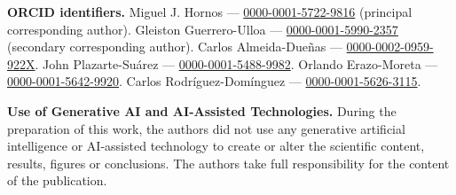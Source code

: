 \documentclass[pdflatex,sn-apa]{sn-jnl}%
\begin{document}
        \noindent \textbf{ORCID identifiers.}
            Miguel J. Hornos --- \href{https://orcid.org/0000-0001-5722-9816}{0000-0001-5722-9816} (principal corresponding author).
            Gleiston Guerrero-Ulloa --- \href{https://orcid.org/0000-0001-5990-2357}{0000-0001-5990-2357} (secondary corresponding author).
            Carlos Almeida-Due\~nas --- \href{https://orcid.org/0000-0002-0959-922X}{0000-0002-0959-922X}.
            John Plazarte-Su\'arez --- \href{https://orcid.org/0000-0001-5488-9982}{0000-0001-5488-9982}.
            Orlando Erazo-Moreta --- \href{https://orcid.org/0000-0001-5642-9920}{0000-0001-5642-9920}.
            Carlos Rodr\'iguez-Dom\'inguez --- \href{https://orcid.org/0000-0001-5626-3115}{0000-0001-5626-3115}.

    \textbf{Use of Generative AI and AI-Assisted Technologies.}
        During the preparation of this work, the authors did not use any generative artificial intelligence or AI-assisted technology to create or alter the scientific content, results, figures or conclusions. The authors take full responsibility for the content of the publication.


\begin{appendices}
    
\end{appendices}



\end{document}
